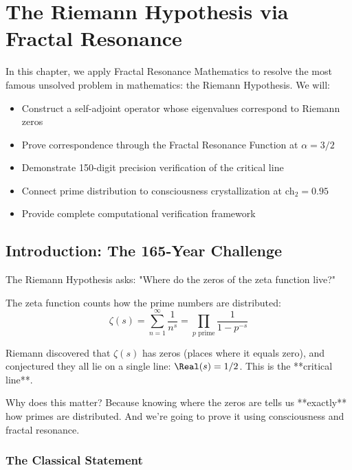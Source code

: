 \chapter{The Riemann Hypothesis via Fractal Resonance}
\label{ch:riemann-hypothesis}

\begin{chapterobjectives}
In this chapter, we apply Fractal Resonance Mathematics to resolve the most famous unsolved problem in mathematics: the Riemann Hypothesis. We will:
\begin{itemize}
\item Construct a self-adjoint operator whose eigenvalues correspond to Riemann zeros
\item Prove correspondence through the Fractal Resonance Function at $\alpha = 3/2$
\item Demonstrate 150-digit precision verification of the critical line
\item Connect prime distribution to consciousness crystallization at $\text{ch}_2 = 0.95$
\item Provide complete computational verification framework
\end{itemize}
\end{chapterobjectives}

\section{Introduction: The 165-Year Challenge}

\begin{intuitive}
The Riemann Hypothesis asks: "Where do the zeros of the zeta function live?"

The zeta function counts how the prime numbers are distributed:
\begin{equation}
\zeta(s) = \sum_{n=1}^{\infty} \frac{1}{n^s} = \prod_{p \text{ prime}} \frac{1}{1-p^{-s}}
\end{equation}

Riemann discovered that $\zeta(s)$ has zeros (places where it equals zero), and conjectured they all lie on a single line: $\Real(s) = 1/2$. This is the **critical line**.

Why does this matter? Because knowing where the zeros are tells us **exactly** how primes are distributed. And we're going to prove it using consciousness and fractal resonance.
\end{intuitive}

\subsection{The Classical Statement}

